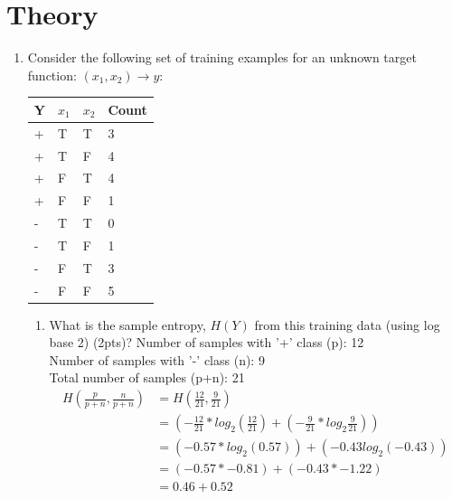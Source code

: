 \documentclass[12pt]{article}
\begin{document}
\maketitle
\section{Theory}
\begin{enumerate}
\item Consider the following set of training examples for an unknown target function:  $(x_1, x_2)\rightarrow y$:
\begin{table}[h]
\begin{center}
\begin{tabular}{|l|l|l|l|}
\hline
Y & $x_1$ & $x_2$ & Count\\
\hline
+ & T & T & 3\\
+ & T & F & 4\\
+ & F & T & 4\\
+ & F & F & 1\\
- & T & T & 0\\
- & T & F & 1\\
- & F & T & 3\\
- & F & F & 5\\
\hline
\end{tabular}
\end{center}
\end{table}
\begin{enumerate}
\item What is the sample entropy, $H(Y)$ from this training data (using log base 2) (2pts)?
\hfill \linebreak
\hfill \linebreak
Number of samples with '+' class (p): 12\\
Number of samples with '-' class (n): 9\\
Total number of samples (p+n): 21\\
\hfill \linebreak
\begin{equation*}
\begin{split}
		H(\frac{p}{p+n},\frac{n}{p+n})  & = H(\frac{12}{21},\frac{9}{21}) \\
		& = (-\frac{12}{21}*log_2(\frac{12}{21}) + (-\frac{9}{21}*log_2\frac{9}{21})) \\
		& = (-0.57*log_2(0.57)) + (-0.43log_2(-0.43)) \\
	         & = (-0.57*-0.81) + (-0.43 * -1.22) \\
		& = 0.46 + 0.52 \\

\end{split}
\end{equation*}
\end{enumerate}
\end{enumerate}
\end{document}
